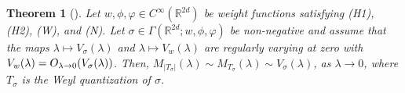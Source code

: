 \documentclass[a4paper,12pt]{article}
\newtheorem{theorem}{Theorem}%
\let\originalleft\left
\let\originalright\right
\renewcommand{\left}{\mathopen{}\mathclose\bgroup\originalleft}
\renewcommand{\right}{\aftergroup\egroup\originalright}
\newcommand{\R}{\mathbb{R}}
\begin{document}
\begin{theorem}[{\cite[Theorem~1.3]{dauge1987weyl}}]\label{thm:Dauge-Robert}
    Let $w, \phi, \varphi \in C^\infty(\R^{2d})$
    be weight functions satisfying (H1), (H2), (W), and (N).
    Let $\sigma\in\Gamma(\R^{2d}; w, \phi, \varphi)$ 
    be non-negative
    and assume that the maps $\lambda \mapsto V_\sigma(\lambda)$ %
    and $\lambda \mapsto V_w(\lambda)$ are regularly varying at zero with $V_w (\lambda) = O_{\lambda\to 0} \left(V_\sigma (\lambda)\right)$.
    Then, $M_{|T_\sigma|} (\lambda) \sim M_{T_\sigma} (\lambda) \sim V_{\sigma} (\lambda)$, as $\lambda\to 0$, where $T_\sigma$ is the Weyl quantization of $\sigma$.
\end{theorem}

\end{document}
